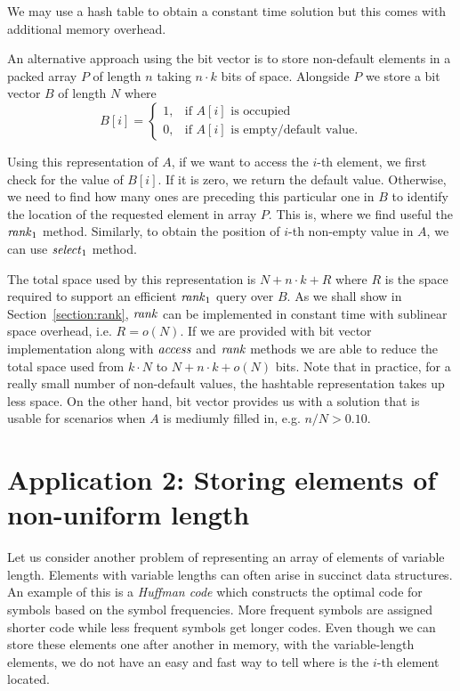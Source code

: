 We may use a hash table to obtain a constant time solution but this comes with additional
memory overhead.

An alternative approach using the bit vector is to store non-default elements in
a packed array $P$ of length $n$ taking $n\cdot k$ bits of space. Alongside $P$ we
store a bit vector $B$ of length $N$ where
\[
   B[i]=
\begin{cases}
   1,& \text{if $A[i]$ is occupied} \\
   0,& \text{if $A[i]$ is empty/default value.}
\end{cases}
\]

Using this representation of $A$, if we want to access the $i$-th element, we first check for
the value of $B[i]$. If it is zero, we return the default value. Otherwise, we need to find
how many ones are preceding this particular one in $B$ to identify the location of the requested
element in array $P$. This is, where we find useful the $\mathit{rank}_1$ method. Similarly, to obtain
the position of $i$-th non-empty value in $A$, we can use $\mathit{select}_1$ method.

The total space used by this representation is $N+n\cdot k+R$ where $R$ is the space required
to support an efficient $\mathit{rank}_1$ query over $B$. As we shall show in Section~\ref{section:rank},
$\mathit{rank}$ can be implemented in constant time with sublinear space overhead, i.e. $R = o(N)$. If we are
provided with bit vector implementation along with $\mathit{access}$ and $\mathit{rank}$ methods we are able to
reduce the total space used from $k\cdot N$ to $N+n\cdot k+o(N)$ bits. Note that in practice,
for a really small number of non-default values, the hashtable representation takes up less
space. On the other hand, bit vector provides us with a solution that is usable for scenarios
when $A$ is mediumly filled in, e.g. $n/N>0.10$.

\section{Application 2: Storing elements of non-uniform length}

Let us consider another problem of representing an array of elements of variable length.
Elements with variable lengths can often arise in succinct data structures. An example of
this is a \textit{Huffman code} \citep{huffman1952method} which constructs the optimal
code for symbols based on the symbol frequencies. More frequent symbols are assigned
shorter code while less frequent symbols get longer codes. Even though we can store these
elements one after another in memory, with the variable-length elements, we do not have
an easy and fast way to tell where is the $i$-th element located.

